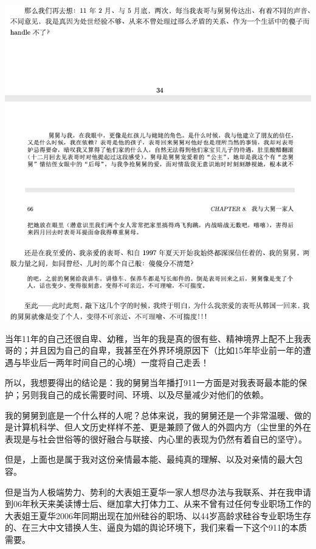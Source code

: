 \documentclass[9pt, b5paper]{article}
\begin{document}
\begin{center}
\includegraphics[width=.9\linewidth]{./pic/readme_20210520_093706.png}
\end{center}

当年11年的自己还很自卑、幼稚，当年的我是真的很有些、精神境界上配不上我表哥的；并且因为自己的自卑，我甚至在外界环境原因下（比如15年毕业前一年的遭遇与毕业后一两年时间自己的心境）一度将自己走丢！

所以，我想要得出的结论是：我的舅舅当年播打911一方面是对我表哥最本能的保护；另则我自己的成长需要时间、环境、以及尽量减少对他们的依赖。 

我的舅舅到底是一个什么样的人呢？总体来说，我的舅舅还是一个非常温暖、做的是计算机科学、但人文历史样样不差、更是兼顾了做人的外圆内方（尘世里的外在表现是与社会世俗等的很好融合与联接、内心里的表现为仍然有着自已的坚守）。

但是，上面也是属于我对这份亲情最本能、最纯真的理解、以及对亲情的最大包容。

但是当为人极端势力、势利的大表姐王夏华一家人想尽办法与我联系、并在我申请到06年秋天来美读博士后、继加拿大打体力工、从来不曾有过任何专业职场工作的大表姐王夏华2006年同期出现在加州硅谷的职场、以44岁高龄求硅谷专业职场生存的、在三大中文错换人生、逼良为娼的舆论环境下，我们来看一下这个911的本质需要。
\end{document}
